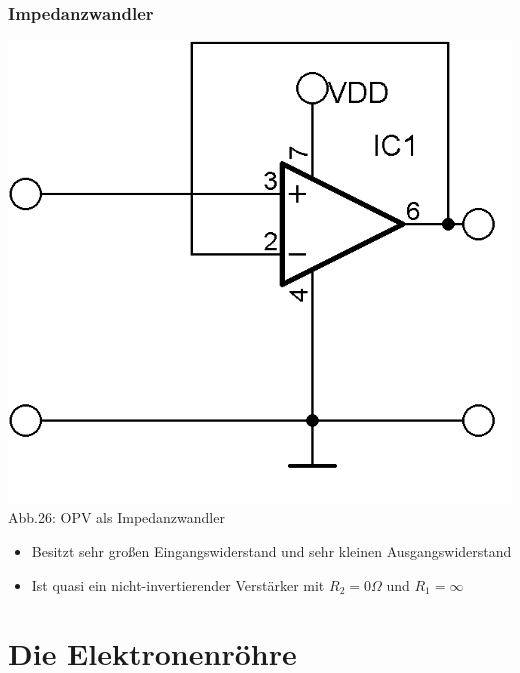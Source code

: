 \begin{frame}
\frametitle{Impedanzwandler}
	\begin{center}
	\includegraphics[scale=1]{a06/Impedanzwandler.png}\\
	Abb.26: OPV als Impedanzwandler
	\end{center}
	\begin{itemize}
		\item	Besitzt sehr großen Eingangswiderstand und sehr kleinen Ausgangswiderstand
		\item	Ist quasi ein nicht-invertierender Verstärker mit $R_2 = 0 \Omega$ und $R_1 = \infty$
	\end{itemize}
\end{frame}


\section*{Die Elektronenröhre}

